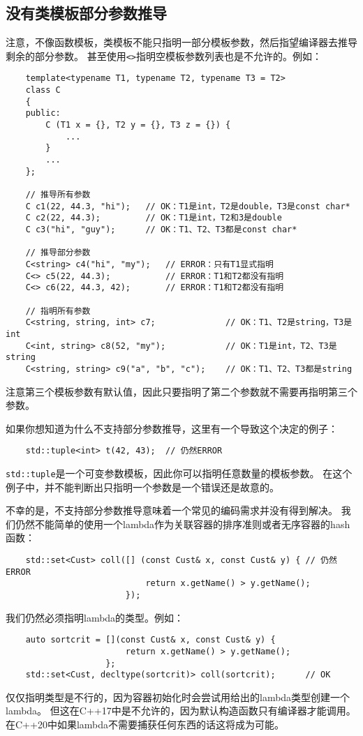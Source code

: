 \subsection{没有类模板部分参数推导}
注意，不像函数模板，类模板不能只指明一部分模板参数，然后指望编译器去推导剩余的部分参数。
甚至使用\texttt{<>}指明空模板参数列表也是不允许的。例如：
\begin{lstlisting}
    template<typename T1, typename T2, typename T3 = T2>
    class C
    {
    public:
        C (T1 x = {}, T2 y = {}, T3 z = {}) {
            ...
        }
        ...
    };

    // 推导所有参数
    C c1(22, 44.3, "hi");   // OK：T1是int，T2是double，T3是const char*
    C c2(22, 44.3);         // OK：T1是int，T2和3是double
    C c3("hi", "guy");      // OK：T1、T2、T3都是const char*

    // 推导部分参数
    C<string> c4("hi", "my");   // ERROR：只有T1显式指明
    C<> c5(22, 44.3);           // ERROR：T1和T2都没有指明
    C<> c6(22, 44.3, 42);       // ERROR：T1和T2都没有指明

    // 指明所有参数
    C<string, string, int> c7;              // OK：T1、T2是string，T3是int
    C<int, string> c8(52, "my");            // OK：T1是int，T2、T3是string
    C<string, string> c9("a", "b", "c");    // OK：T1、T2、T3都是string
\end{lstlisting}
注意第三个模板参数有默认值，因此只要指明了第二个参数就不需要再指明第三个参数。

如果你想知道为什么不支持部分参数推导，这里有一个导致这个决定的例子：
\begin{lstlisting}
    std::tuple<int> t(42, 43);  // 仍然ERROR
\end{lstlisting}
\texttt{std::tuple}是一个可变参数模板，因此你可以指明任意数量的模板参数。
在这个例子中，并不能判断出只指明一个参数是一个错误还是故意的。

不幸的是，不支持部分参数推导意味着一个常见的编码需求并没有得到解决。
我们仍然不能简单的使用一个lambda作为关联容器的排序准则或者无序容器的hash函数：
\begin{lstlisting}
    std::set<Cust> coll([] (const Cust& x, const Cust& y) { // 仍然ERROR
                            return x.getName() > y.getName();
                        });
\end{lstlisting}
我们仍然必须指明lambda的类型。例如：
\begin{lstlisting}
    auto sortcrit = [](const Cust& x, const Cust& y) {
                        return x.getName() > y.getName();
                    };
    std::set<Cust, decltype(sortcrit)> coll(sortcrit);      // OK
\end{lstlisting}
仅仅指明类型是不行的，因为容器初始化时会尝试用给出的lambda类型创建一个lambda。
但这在C++17中是不允许的，因为默认构造函数只有编译器才能调用。
在C++20中如果lambda不需要捕获任何东西的话这将成为可能。

